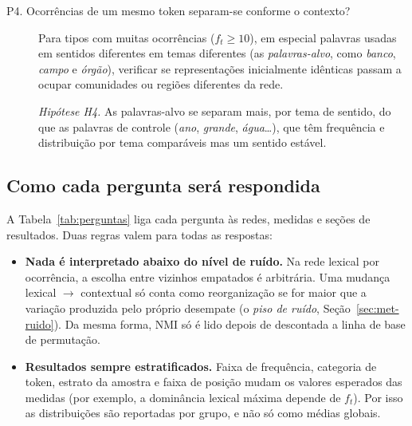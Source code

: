 \begin{description}
    \item[P4. Ocorrências de um mesmo token separam-se conforme o contexto?]
    Para tipos com muitas ocorrências ($f_t\ge 10$), em especial palavras usadas em sentidos
    diferentes em temas diferentes (as \emph{palavras-alvo}, como \emph{banco}, \emph{campo} e
    \emph{órgão}), verificar se representações inicialmente idênticas passam a ocupar
    comunidades ou regiões diferentes da rede.

    \emph{Hipótese H4.} As palavras-alvo se separam mais, por tema de sentido, do que as
    palavras de controle (\emph{ano}, \emph{grande}, \emph{água}\ldots), que têm frequência e
    distribuição por tema comparáveis mas um sentido estável.
\end{description}

\subsection{Como cada pergunta será respondida}

A Tabela~\ref{tab:perguntas} liga cada pergunta às redes, medidas e seções de resultados. Duas
regras valem para todas as respostas:
\begin{itemize}
    \item \textbf{Nada é interpretado abaixo do nível de ruído.} Na rede lexical por
    ocorrência, a escolha entre vizinhos empatados é arbitrária. Uma mudança lexical $\to$
    contextual só conta como reorganização se for maior que a variação produzida pelo próprio
    desempate (o \emph{piso de ruído}, Seção~\ref{sec:met-ruido}). Da mesma forma, NMI só é
    lido depois de descontada a linha de base de permutação.
    \item \textbf{Resultados sempre estratificados.} Faixa de frequência, categoria de token,
    estrato da amostra e faixa de posição mudam os valores esperados das medidas (por exemplo, a
    dominância lexical máxima depende de $f_t$). Por isso as distribuições são reportadas por
    grupo, e não só como médias globais.
\end{itemize}

